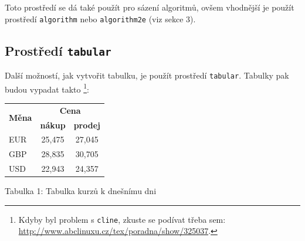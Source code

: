 \documentclass[11pt]{article}
\begin{document}
    Toto prostředí se dá také použít pro sázení algoritmů, ovšem vhodnější je použít prostředí \verb|algorithm| nebo \verb|algorithm2e| (viz sekce 3).

    \subsection{Prostředí \texttt{tabular}}
    Další možností, jak vytvořit tabulku, je použít prostředí \verb|tabular|. Tabulky pak budou vypadat takto \footnote[1]{Kdyby byl problem s \texttt{cline}, zkuste se podívat třeba sem: \href{http://www.abclinuxu.cz/tex/poradna/show/325037}{http://www.abclinuxu.cz/tex/poradna/show/325037}.}:

    \begin{center}
        \begin{tabular}{|l|c|c|}
            \hline
            \multirow{2}{*}{\textbf{Měna}} &    \multicolumn{2}{|c|}{\textbf{Cena}} \\

                                                \cline { 2 - 3 }
                                                & \textbf{nákup}     & \textbf{prodej} \\

            \hline
            EUR         & 25,475    & 27,045    \\
            GBP         & 28,835    & 30,705    \\
            USD         & 22,943    & 24,357    \\
            \hline
        \end{tabular}
    \end{center}
    \begin{center}
        Tabulka 1: Tabulka kurzů $\mathrm{k}$ dnešnímu dni
    \end{center}
\end{document}
